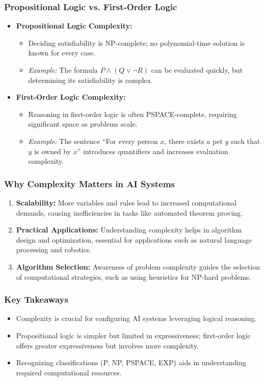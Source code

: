 \documentclass[aspectratio=169]{beamer}
\begin{document}
\begin{frame}[fragile]
    \frametitle{Propositional Logic vs. First-Order Logic}
    \begin{itemize}
        \item \textbf{Propositional Logic Complexity:}
        \begin{itemize}
            \item Deciding satisfiability is NP-complete; no polynomial-time solution is known for every case.
            \item \textit{Example:} The formula \( P \land (Q \lor \neg R) \) can be evaluated quickly, but determining its satisfiability is complex.
        \end{itemize}
        
        \item \textbf{First-Order Logic Complexity:}
        \begin{itemize}
            \item Reasoning in first-order logic is often PSPACE-complete, requiring significant space as problems scale.
            \item \textit{Example:} The sentence “For every person \(x\), there exists a pet \(y\) such that \(y\) is owned by \(x\)” introduces quantifiers and increases evaluation complexity.
        \end{itemize}
    \end{itemize}
\end{frame}

\begin{frame}[fragile]
    \frametitle{Why Complexity Matters in AI Systems}
    \begin{enumerate}
        \item \textbf{Scalability:} More variables and rules lead to increased computational demands, causing inefficiencies in tasks like automated theorem proving.
        \item \textbf{Practical Applications:} Understanding complexity helps in algorithm design and optimization, essential for applications such as natural language processing and robotics.
        \item \textbf{Algorithm Selection:} Awareness of problem complexity guides the selection of computational strategies, such as using heuristics for NP-hard problems.
    \end{enumerate}
\end{frame}

\begin{frame}[fragile]
    \frametitle{Key Takeaways}
    \begin{itemize}
        \item Complexity is crucial for configuring AI systems leveraging logical reasoning.
        \item Propositional logic is simpler but limited in expressiveness; first-order logic offers greater expressiveness but involves more complexity.
        \item Recognizing classifications (P, NP, PSPACE, EXP) aids in understanding required computational resources.
    \end{itemize}
\end{frame}
\end{document}
